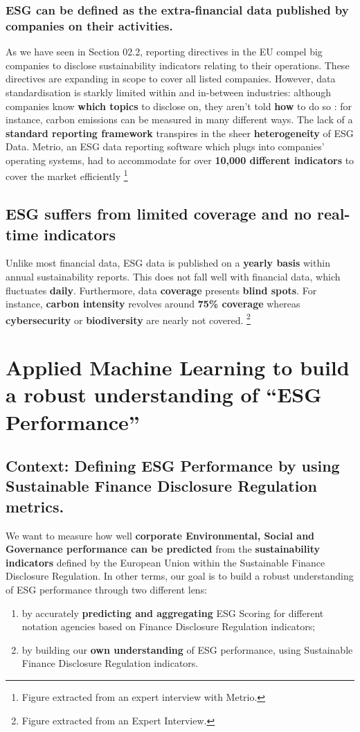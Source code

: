 \documentclass[12pt]{report}
\begin{document}
\subsubsection{ESG can be defined as the extra-financial data published by companies on their activities.}
As we have seen in Section 02.2, reporting directives in the EU compel big companies to disclose sustainability indicators relating to their operations. These directives are expanding in scope to cover all listed companies. However, data standardisation is starkly limited within and in-between industries: although companies know \textbf{which topics} to disclose on, they aren't told \textbf{how} to do so : for instance, carbon emissions can be measured in many different ways. The lack of a \textbf{standard reporting framework} transpires in the sheer \textbf{heterogeneity} of ESG Data. Metrio, an ESG data reporting software which plugs into companies' operating systems, had to accommodate for over \textbf{10,000 different indicators} to cover the market efficiently \footnote{Figure extracted from an expert interview with Metrio.}
\subsection{ESG suffers from limited coverage and no real-time indicators}
Unlike most financial data, ESG data is published on a \textbf{yearly basis} within annual sustainability reports. This does not fall well with financial data, which fluctuates \textbf{daily}. Furthermore, data \textbf{coverage} presents \textbf{blind spots}. For instance, \textbf{carbon intensity} revolves around \textbf{75\% coverage} whereas \textbf{cybersecurity} or \textbf{biodiversity} are nearly not covered. \footnote{Figure extracted from an Expert Interview.}

\section{Applied Machine Learning to build a robust understanding of “ESG Performance”}

\subsection{Context: Defining ESG Performance by using Sustainable Finance Disclosure Regulation metrics.}
We want to measure how well \textbf{corporate Environmental, Social and Governance performance can be predicted }from the \textbf{sustainability indicators} defined by the European Union within the Sustainable Finance Disclosure Regulation.\newline
In other terms, our goal is to build a robust understanding of ESG performance through two different lens:
\begin{enumerate}
    \item by accurately \textbf{predicting and aggregating} ESG Scoring for different notation agencies based on Finance Disclosure Regulation indicators;
    \item by building our \textbf{own understanding} of ESG performance, using Sustainable Finance Disclosure Regulation indicators.
\end{enumerate}
\end{document}
